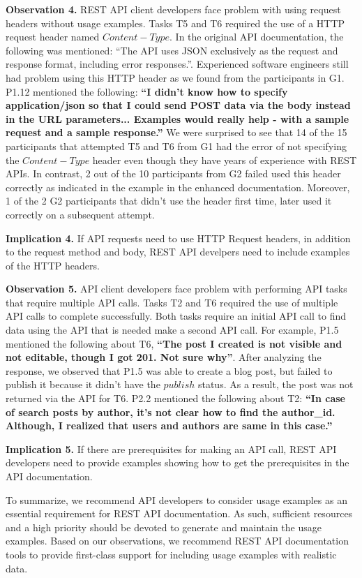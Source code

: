 \documentclass[conference]{IEEEtran}
\begin{document}
\textbf{Observation 4.} REST API client developers face problem with using request headers without usage examples. Tasks T5 and T6 required the use of a HTTP request header named $Content-Type$. In the original API documentation, the following was mentioned: ``The API uses JSON exclusively as the request and response format, including error responses.''. Experienced software engineers still had problem using this HTTP header as we found from the participants in G1. P1.12 mentioned the following: \textbf{``I didn't know how to specify application/json so that I could send POST data via the body instead in the URL parameters... Examples would really help - with a sample request and a sample response.''} We were surprised to see that 14 of the 15 participants that attempted T5 and T6 from G1 had the error of not specifying the $Content-Type$ header even though they have years of experience with REST APIs. In contrast, 2 out of the 10 participants from G2 failed used this header correctly as indicated in the example in the enhanced documentation. Moreover, 1 of the 2 G2 participants that didn't use the header first time, later used it correctly on a subsequent attempt.

\textbf{Implication 4.} If API requests need to use HTTP Request headers, in addition to the request method and body, REST API develpers need to include examples of the HTTP headers.

\textbf{Observation 5.} API client developers face problem with performing API tasks that require multiple API calls. Tasks T2 and T6 required the use of multiple API calls to complete successfully. Both tasks require an initial API call to find data using the API that is needed make a second API call. For example, P1.5 mentioned the following about T6, \textbf{``The post I created is not visible and not editable, though I got 201. Not sure why''}. After analyzing the response, we observed that P1.5 was able to create a blog post, but failed to publish it because it didn't have the $publish$ status. As a result, the post was not returned via the API for T6. P2.2 mentioned the following about T2: \textbf{``In case of search posts by author, it's not clear how to find the author\_id. Although, I realized that users and authors are same in this case.''}

\textbf{Implication 5.} If there are prerequisites for making an API call, REST API developers need to provide examples showing how to get the prerequisites in the API documentation.


To summarize, we recommend API developers to consider usage examples as an essential requirement for REST API documentation. As such, sufficient resources and a high priority should be devoted to generate and maintain the usage examples. Based on our observations, we recommend REST API documentation tools to provide first-class support for including usage examples with realistic data.
\end{document}
